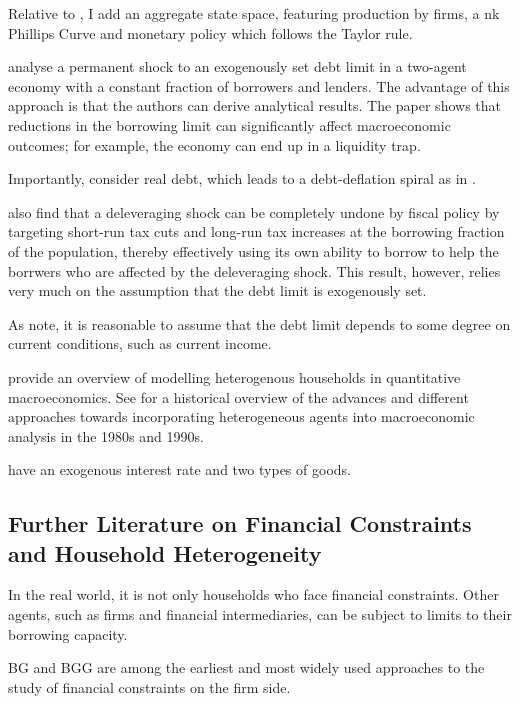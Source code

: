 \documentclass[12pt]{article} %
\numberwithin{equation}{section} %
\begin{document}
Relative to \textcite{gl2017}, I add an aggregate state space, featuring production by firms, a \Gls{nk} Phillips Curve and monetary policy which follows the Taylor rule.

\textcite{egg2012} analyse a permanent shock to an exogenously set debt limit in a two-agent economy with a constant fraction of borrowers and lenders. The advantage of this approach is that the authors can derive analytical results. The paper shows that reductions in the borrowing limit can significantly affect macroeconomic outcomes; for example, the economy can end up in a liquidity trap.

Importantly, \textcite{egg2012} consider real debt, which leads to a debt-deflation spiral as in \textcite{fisher1933}.

\textcite{egg2012} also find that a deleveraging shock can be completely undone by fiscal policy by targeting short-run tax cuts and long-run tax increases at the borrowing fraction of the population, thereby effectively using its own ability to borrow to help the borrwers who are affected by the deleveraging shock. This result, however, relies very much on the assumption that the debt limit is exogenously set.

As \textcite{egg2012} note, it is reasonable to assume that the debt limit depends to some degree on current conditions, such as current income.

\textcite{heath2009} provide an overview of modelling heterogenous households in quantitative macroeconomics. See \textcite{cherrier2023} for a historical overview of the advances and different approaches towards incorporating heterogeneous agents into macroeconomic analysis in the 1980s and 1990s.

\textcite{riosrull2015} have an exogenous interest rate and two types of goods.

\subsection{Further Literature on Financial Constraints and Household Heterogeneity}
\label{sec:literature-more}

In the real world, it is not only households who face financial constraints. Other agents, such as firms and financial intermediaries, can be subject to limits to their borrowing capacity.

BG and BGG are among the earliest and most widely used approaches to the study of financial constraints on the firm side.
\end{document}
